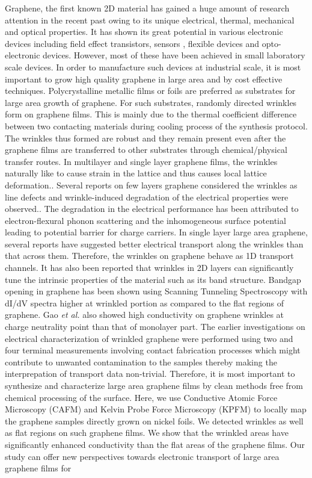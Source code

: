 \documentclass[preprint,aps,preprint,amsmath,amssymb]{revtex4-1}
\begin{document}
Graphene, the first known 2D material has gained a huge amount of research attention in the recent past owing to its unique electrical, thermal, mechanical and optical properties.\cite{Castro, Balandin, Geim} It has shown its great potential in various electronic devices including field effect transistors\cite{Novoselov}, sensors \cite{Choi}, flexible devices \cite{Kim} and opto-electronic devices.\cite{Bablich} However, most of these have been achieved in small laboratory scale devices.  In order to manufacture such devices at industrial scale, it is most important to grow high quality graphene in large area and by cost effective techniques. Polycrystalline metallic films or foils are preferred as substrates for large area growth of graphene. For such substrates, randomly directed wrinkles form on graphene films. This is mainly due to the thermal coefficient difference between two contacting materials during cooling process of the synthesis protocol. The wrinkles thus formed are robust and they remain present even after the graphene films are transferred to other substrates through chemical/physical transfer routes\cite{Hattab, Chae}. In multilayer and single layer graphene films, the wrinkles naturally like to cause strain in the lattice and thus causes local lattice deformation.\cite{Ma, Pereira}. Several reports on few layers graphene considered the wrinkles as line defects and wrinkle-induced degradation of the electrical properties were observed.\cite{Clark, Schneider, Willke}. The degradation in the electrical performance has been attributed to electron-flexural phonon scattering and the inhomogeneous surface potential leading to potential barrier for charge carriers.\cite{Vasi, Ni} In single layer large area graphene, several reports have suggested better electrical transport along the wrinkles than that across them. Therefore, the wrinkles on graphene behave as 1D transport channels.\cite{Zhu, Orcid} It has also been reported that wrinkles in 2D layers can significantly tune the intrinsic properties of the material such as its band structure. Bandgap opening in graphene has been shown using Scanning Tunneling Spectroscopy with dI/dV spectra higher at wrinkled portion as compared to the flat regions of graphene.\cite{Lim} Gao \textit{et al.} also showed high conductivity on graphene wrinkles at charge neutrality point than that of monolayer part.\cite{Song} The earlier investigations on electrical characterization of wrinkled graphene were performed using two and four terminal measurements involving contact fabrication processes which might contribute to unwanted contamination to the samples thereby making the interprepation of transport data non-trivial.\cite{Zhu, Ni, Zhang} Therefore, it is most important to synthesize and characterize large area graphene films by clean methods free from chemical processing of the surface. Here, we use Conductive Atomic Force Microscopy (CAFM) and Kelvin Probe Force Microscopy (KPFM) to locally map the graphene samples directly grown on nickel foils. We detected wrinkles as well as flat regions on such graphene films. We show that the wrinkled areas have significantly enhanced conductivity than the flat areas of the graphene films. Our study can offer new perspectives towards electronic transport of large area graphene films for 
\end{document}
